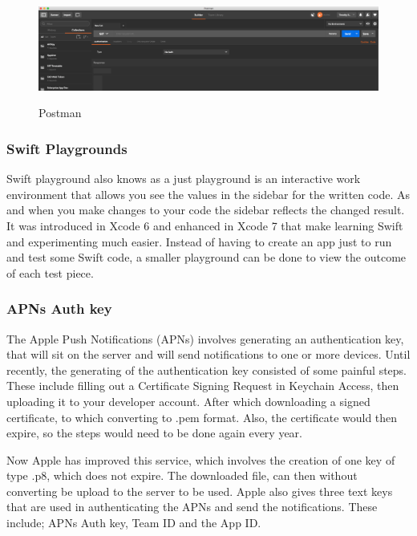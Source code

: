 \begin{figure}[!h]
    \caption{Postman}
    \centering
    \includegraphics[width=150mm]{images/postman}
    \label{fig:postman}
\end{figure}


\subsubsection{Swift Playgrounds}

Swift \cite{xcode} playground also knows as a just playground is an interactive work environment that allows you see the values in the sidebar for the written code. As and when you make changes to your code the sidebar reflects the changed result. It was introduced in Xcode 6 and enhanced in Xcode 7 that make learning Swift and experimenting much easier. Instead of having to create an app just to run and test some Swift code, a smaller playground can be done to view the outcome of each test piece.

\subsubsection{APNs Auth key}

The Apple Push Notifications (APNs) \cite{apns_web} involves generating an authentication key, that will sit on the server and will send notifications to one or more devices. Until recently, the generating of the authentication key consisted of some painful steps. These include filling out a Certificate Signing Request in Keychain Access, then uploading it to your developer account. After which downloading a signed certificate, to which converting to .pem format. Also, the certificate would then expire, so the steps would need to be done again every year.

Now Apple has improved this service, which involves the creation of one key of type .p8, which does not expire. The downloaded file, can then without converting be upload to the server to be used. Apple also gives three text keys that are used in authenticating the APNs and send the notifications. These include; APNs Auth key, Team ID and the App ID.

